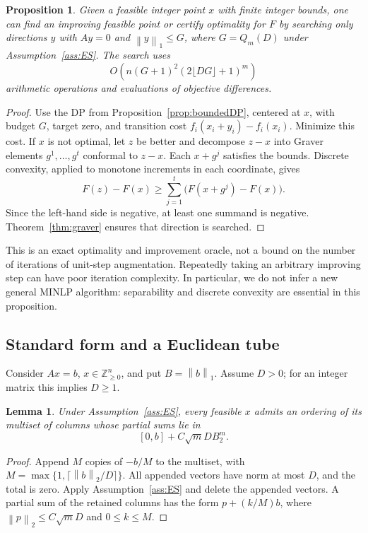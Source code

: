 \documentclass[11pt]{article}
\newtheorem{lemma}[theorem]{Lemma}
\newtheorem{proposition}[theorem]{Proposition}
\theoremstyle{definition}
\theoremstyle{remark}
\newcommand{\Z}{\mathbb Z}
\newcommand{\norm}[1]{\left\lVert #1\right\rVert}
\begin{document}
\begin{proposition}\label{prop:convex}
Given a feasible integer point $x$ with finite integer bounds, one can
find an improving feasible point or certify optimality for $F$ by searching
only directions $y$ with $Ay=0$ and $\norm y_1\le G$, where
$G=Q_m(D)$ under Assumption~\ref{ass:ES}.
The search uses
\[
 O\!\left(n(G+1)^2(2\lfloor DG\rfloor+1)^m\right)
\]
arithmetic operations and evaluations of objective differences.
\end{proposition}
\begin{proof}
Use the DP from Proposition~\ref{prop:boundedDP}, centered at $x$, with
budget $G$, target zero, and transition cost
$f_i(x_i+y_i)-f_i(x_i)$. Minimize this cost.
If $x$ is not optimal, let $z$ be better and decompose $z-x$ into Graver
elements $g^1,\ldots,g^t$ conformal to $z-x$. Each $x+g^j$ satisfies
the bounds. Discrete convexity, applied to monotone increments in each
coordinate, gives
\[
 F(z)-F(x)\ge\sum_{j=1}^t\big(F(x+g^j)-F(x)\big).
\]
Since the left-hand side is negative, at least one summand is negative.
Theorem~\ref{thm:graver} ensures that direction is searched.
\end{proof}

This is an exact optimality and improvement oracle, not a bound on the
number of iterations of unit-step augmentation. Repeatedly taking an
arbitrary improving step can have poor iteration complexity. In particular,
we do not infer a new general MINLP algorithm: separability and discrete
convexity are essential in this proposition.

\subsection{Standard form and a Euclidean tube}

Consider $Ax=b$, $x\in\Z^n_{\ge0}$, and put $B=\norm b_1$.
Assume $D>0$; for an integer matrix this implies $D\ge1$.
\begin{lemma}\label{lem:tube}
Under Assumption~\ref{ass:ES}, every feasible $x$ admits an ordering of
its multiset of columns whose partial sums lie in
\[
 [0,b]+C\sqrt m D B_2^m.
 \tag{7}\label{eq:tube}
\]
\end{lemma}
\begin{proof}
Append $M$ copies of $-b/M$ to the multiset, with
$M=\max\{1,\lceil\norm b_2/D\rceil\}$. All appended vectors have norm
at most $D$, and the total is zero. Apply Assumption~\ref{ass:ES} and
delete the appended vectors. A partial sum of the retained columns has
the form $p+(k/M)b$, where $\norm p_2\le C\sqrt m D$ and $0\le k\le M$.
\end{proof}
\end{document}
